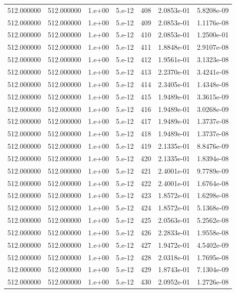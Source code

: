\begin{table}[htbp]
\begin{tabular}{rrrrrrr}
512.000000 & 512.000000 & 1.e+00 & 5.e-12 & 408 & 2.0853e-01 & 5.8208e-09 \\
512.000000 & 512.000000 & 1.e+00 & 5.e-12 & 409 & 2.0853e-01 & 1.1176e-08 \\
512.000000 & 512.000000 & 1.e+00 & 5.e-12 & 410 & 2.0853e-01 & 1.2500e-01 \\
512.000000 & 512.000000 & 1.e+00 & 5.e-12 & 411 & 1.8848e-01 & 2.9107e-08 \\
512.000000 & 512.000000 & 1.e+00 & 5.e-12 & 412 & 1.9561e-01 & 3.1323e-08 \\
512.000000 & 512.000000 & 1.e+00 & 5.e-12 & 413 & 2.2370e-01 & 3.4241e-08 \\
512.000000 & 512.000000 & 1.e+00 & 5.e-12 & 414 & 2.3405e-01 & 1.4348e-08 \\
512.000000 & 512.000000 & 1.e+00 & 5.e-12 & 415 & 1.9489e-01 & 3.3615e-09 \\
512.000000 & 512.000000 & 1.e+00 & 5.e-12 & 416 & 1.9489e-01 & 3.0268e-09 \\
512.000000 & 512.000000 & 1.e+00 & 5.e-12 & 417 & 1.9489e-01 & 1.3737e-08 \\
512.000000 & 512.000000 & 1.e+00 & 5.e-12 & 418 & 1.9489e-01 & 1.3737e-08 \\
512.000000 & 512.000000 & 1.e+00 & 5.e-12 & 419 & 2.1335e-01 & 8.8476e-09 \\
512.000000 & 512.000000 & 1.e+00 & 5.e-12 & 420 & 2.1335e-01 & 1.8394e-08 \\
512.000000 & 512.000000 & 1.e+00 & 5.e-12 & 421 & 2.4001e-01 & 9.7789e-09 \\
512.000000 & 512.000000 & 1.e+00 & 5.e-12 & 422 & 2.4001e-01 & 1.6764e-08 \\
512.000000 & 512.000000 & 1.e+00 & 5.e-12 & 423 & 1.8572e-01 & 1.6298e-08 \\
512.000000 & 512.000000 & 1.e+00 & 5.e-12 & 424 & 1.8572e-01 & 5.1368e-09 \\
512.000000 & 512.000000 & 1.e+00 & 5.e-12 & 425 & 2.0563e-01 & 5.2562e-08 \\
512.000000 & 512.000000 & 1.e+00 & 5.e-12 & 426 & 2.2833e-01 & 1.9558e-08 \\
512.000000 & 512.000000 & 1.e+00 & 5.e-12 & 427 & 1.9472e-01 & 4.5402e-09 \\
512.000000 & 512.000000 & 1.e+00 & 5.e-12 & 428 & 2.0318e-01 & 1.7695e-08 \\
512.000000 & 512.000000 & 1.e+00 & 5.e-12 & 429 & 1.8743e-01 & 7.1304e-09 \\
512.000000 & 512.000000 & 1.e+00 & 5.e-12 & 430 & 2.0952e-01 & 1.2726e-08 \\

\end{tabular}
\end{table}

